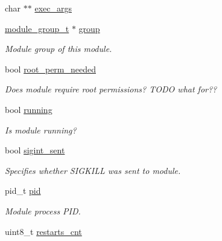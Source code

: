 \begin{DoxyCompactItemize}
char $\ast$$\ast$ \hyperlink{structmodule__s_afdb5c15857dfc3c323b0e0a0da3a2804}{exec\+\_\+args}
\item 
\mbox{\label{structmodule__s_aa006bde52bc0cf31698db7db6eedb7df}} 
\hyperlink{structmodule__group__s}{module\+\_\+group\+\_\+t} $\ast$ \hyperlink{structmodule__s_aa006bde52bc0cf31698db7db6eedb7df}{group}
\begin{DoxyCompactList}\small\item\em Module group of this module. \end{DoxyCompactList}\item 
\mbox{\label{structmodule__s_afba6525baa9dc16e0db9644ef239e98c}} 
bool \hyperlink{structmodule__s_afba6525baa9dc16e0db9644ef239e98c}{root\+\_\+perm\+\_\+needed}
\begin{DoxyCompactList}\small\item\em Does module require root permissions? T\+O\+DO what for?? \end{DoxyCompactList}\item 
\mbox{\label{structmodule__s_a4d98e0bdfbc4609e31e50af69294e8b3}} 
bool \hyperlink{structmodule__s_a4d98e0bdfbc4609e31e50af69294e8b3}{running}
\begin{DoxyCompactList}\small\item\em Is module running? \end{DoxyCompactList}\item 
\mbox{\label{structmodule__s_ac69105ff4d526a7f2c0c2f115eb80c9a}} 
bool \hyperlink{structmodule__s_ac69105ff4d526a7f2c0c2f115eb80c9a}{sigint\+\_\+sent}
\begin{DoxyCompactList}\small\item\em Specifies whether S\+I\+G\+K\+I\+LL was sent to module. \end{DoxyCompactList}\item 
\mbox{\label{structmodule__s_ae1540d097c71598f9174241cbd437499}} 
pid\+\_\+t \hyperlink{structmodule__s_ae1540d097c71598f9174241cbd437499}{pid}
\begin{DoxyCompactList}\small\item\em Module process P\+ID. \end{DoxyCompactList}\item 
uint8\+\_\+t \hyperlink{structmodule__s_af58ad81bdb0bdc3396987bbfcf818870}{restarts\+\_\+cnt}
$$
\end{DoxyCompactItemize}
